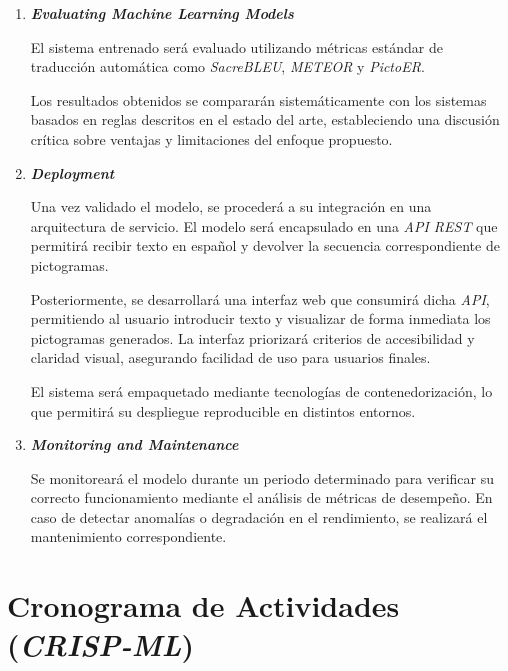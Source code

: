 \documentclass[10pt,letterpaper]{article}
\begin{document}
\begin{enumerate}
    Adicionalmente, se implementará un sistema base comparativo, posiblemente basado en mapeo léxico directo, con el fin de establecer una referencia cuantitativa que permita demostrar las mejoras aportadas por el enfoque neuronal.

    \item \textbf{\textit{Evaluating Machine Learning Models}}

    El sistema entrenado será evaluado utilizando métricas estándar de traducción automática como \textit{SacreBLEU}, \textit{METEOR} y \textit{PictoER}.

    Los resultados obtenidos se compararán sistemáticamente con los sistemas basados en reglas descritos en el estado del arte, estableciendo una discusión crítica sobre ventajas y limitaciones del enfoque propuesto.

    \item \textbf{\textit{Deployment}}

    Una vez validado el modelo, se procederá a su integración en una arquitectura de servicio. El modelo será encapsulado en una \textit{API REST} que permitirá recibir texto en español y devolver la secuencia correspondiente de pictogramas.

    Posteriormente, se desarrollará una interfaz web que consumirá dicha \textit{API}, permitiendo al usuario introducir texto y visualizar de forma inmediata los pictogramas generados. La interfaz priorizará criterios de accesibilidad y claridad visual, asegurando facilidad de uso para usuarios finales.
    
    El sistema será empaquetado mediante tecnologías de contenedorización, lo que permitirá su despliegue reproducible en distintos entornos.

    \item \textbf{\textit{Monitoring and Maintenance}}
    
    Se monitoreará el modelo durante un periodo determinado para verificar su correcto funcionamiento mediante el análisis de métricas de desempeño. En caso de detectar anomalías o degradación en el rendimiento, se realizará el mantenimiento correspondiente.

\end{enumerate}


\newpage
\section{Cronograma de Actividades (\textit{CRISP-ML})}
\end{document}
